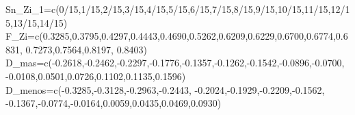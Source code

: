 \documentclass[
  a4paper,
  oneside,
  openany]{book}
\newenvironment{Shaded}{\begin{snugshade}}{\end{snugshade}}
\newcommand{\DecValTok}[1]{\textcolor[rgb]{0.00,0.00,0.81}{#1}}
\newcommand{\FloatTok}[1]{\textcolor[rgb]{0.00,0.00,0.81}{#1}}
\newcommand{\FunctionTok}[1]{\textcolor[rgb]{0.00,0.00,0.00}{#1}}
\newcommand{\NormalTok}[1]{#1}
\newcommand{\OtherTok}[1]{\textcolor[rgb]{0.56,0.35,0.01}{#1}}
\newcommand{\SpecialCharTok}[1]{\textcolor[rgb]{0.00,0.00,0.00}{#1}}
\begin{document}
\begin{Shaded}
\begin{Highlighting}[]
\NormalTok{Sn\_Zi\_1}\OtherTok{=}\FunctionTok{c}\NormalTok{(}\DecValTok{0}\SpecialCharTok{/}\DecValTok{15}\NormalTok{,}\DecValTok{1}\SpecialCharTok{/}\DecValTok{15}\NormalTok{,}\DecValTok{2}\SpecialCharTok{/}\DecValTok{15}\NormalTok{,}\DecValTok{3}\SpecialCharTok{/}\DecValTok{15}\NormalTok{,}\DecValTok{4}\SpecialCharTok{/}\DecValTok{15}\NormalTok{,}\DecValTok{5}\SpecialCharTok{/}\DecValTok{15}\NormalTok{,}\DecValTok{6}\SpecialCharTok{/}\DecValTok{15}\NormalTok{,}\DecValTok{7}\SpecialCharTok{/}\DecValTok{15}\NormalTok{,}\DecValTok{8}\SpecialCharTok{/}\DecValTok{15}\NormalTok{,}\DecValTok{9}\SpecialCharTok{/}\DecValTok{15}\NormalTok{,}\DecValTok{10}\SpecialCharTok{/}\DecValTok{15}\NormalTok{,}\DecValTok{11}\SpecialCharTok{/}\DecValTok{15}\NormalTok{,}\DecValTok{12}\SpecialCharTok{/}\DecValTok{15}\NormalTok{,}\DecValTok{13}\SpecialCharTok{/}\DecValTok{15}\NormalTok{,}\DecValTok{14}\SpecialCharTok{/}\DecValTok{15}\NormalTok{)}
\NormalTok{F\_Zi}\OtherTok{=}\FunctionTok{c}\NormalTok{(}\FloatTok{0.3285}\NormalTok{,}\FloatTok{0.3795}\NormalTok{,}\FloatTok{0.4297}\NormalTok{,}\FloatTok{0.4443}\NormalTok{,}\FloatTok{0.4690}\NormalTok{,}\FloatTok{0.5262}\NormalTok{,}\FloatTok{0.6209}\NormalTok{,}\FloatTok{0.6229}\NormalTok{,}\FloatTok{0.6700}\NormalTok{,}\FloatTok{0.6774}\NormalTok{,}\FloatTok{0.6831}\NormalTok{,}
       \FloatTok{0.7273}\NormalTok{,}\FloatTok{0.7564}\NormalTok{,}\FloatTok{0.8197}\NormalTok{, }\FloatTok{0.8403}\NormalTok{)}
\NormalTok{D\_mas}\OtherTok{=}\FunctionTok{c}\NormalTok{(}\SpecialCharTok{{-}}\FloatTok{0.2618}\NormalTok{,}\SpecialCharTok{{-}}\FloatTok{0.2462}\NormalTok{,}\SpecialCharTok{{-}}\FloatTok{0.2297}\NormalTok{,}\SpecialCharTok{{-}}\FloatTok{0.1776}\NormalTok{,}\SpecialCharTok{{-}}\FloatTok{0.1357}\NormalTok{,}\SpecialCharTok{{-}}\FloatTok{0.1262}\NormalTok{,}\SpecialCharTok{{-}}\FloatTok{0.1542}\NormalTok{,}\SpecialCharTok{{-}}\FloatTok{0.0896}\NormalTok{,}\SpecialCharTok{{-}}\FloatTok{0.0700}\NormalTok{,}
        \SpecialCharTok{{-}}\FloatTok{0.0108}\NormalTok{,}\FloatTok{0.0501}\NormalTok{,}\FloatTok{0.0726}\NormalTok{,}\FloatTok{0.1102}\NormalTok{,}\FloatTok{0.1135}\NormalTok{,}\FloatTok{0.1596}\NormalTok{)}
\NormalTok{D\_menos}\OtherTok{=}\FunctionTok{c}\NormalTok{(}\SpecialCharTok{{-}}\FloatTok{0.3285}\NormalTok{,}\SpecialCharTok{{-}}\FloatTok{0.3128}\NormalTok{,}\SpecialCharTok{{-}}\FloatTok{0.2963}\NormalTok{,}\SpecialCharTok{{-}}\FloatTok{0.2443}\NormalTok{, }\SpecialCharTok{{-}}\FloatTok{0.2024}\NormalTok{,}\SpecialCharTok{{-}}\FloatTok{0.1929}\NormalTok{,}\SpecialCharTok{{-}}\FloatTok{0.2209}\NormalTok{,}\SpecialCharTok{{-}}\FloatTok{0.1562}\NormalTok{,}
           \SpecialCharTok{{-}}\FloatTok{0.1367}\NormalTok{,}\SpecialCharTok{{-}}\FloatTok{0.0774}\NormalTok{,}\SpecialCharTok{{-}}\FloatTok{0.0164}\NormalTok{,}\FloatTok{0.0059}\NormalTok{,}\FloatTok{0.0435}\NormalTok{,}\FloatTok{0.0469}\NormalTok{,}\FloatTok{0.0930}\NormalTok{)  }


\end{Highlighting}
\end{Shaded}
\end{document}
